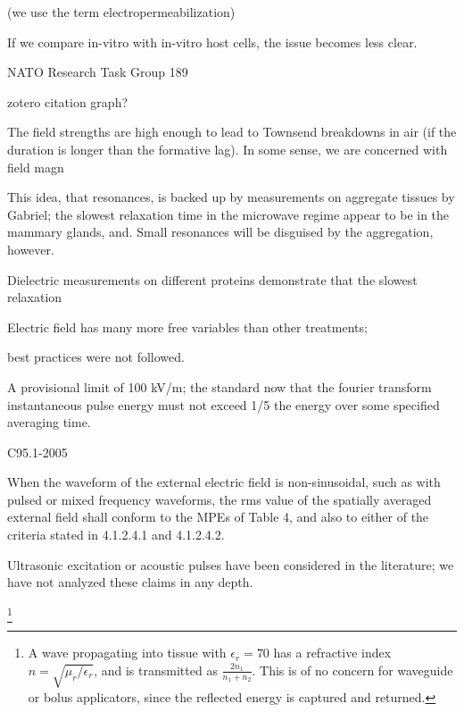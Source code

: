 \documentclass[paper.tex]{subfiles}
\begin{document}
\begin{multicols}{1}
(we use the term electropermeabilization)


If we compare in-vitro with in-vitro host cells, the issue becomes less clear.


NATO Research Task Group 189 \cite{treatyelectromagnetic}

zotero citation graph?


The field strengths are high enough to lead to Townsend breakdowns in air (if the duration is longer than the formative lag). In some sense, we are concerned with field magn

This idea, that resonances, is backed up by measurements on aggregate tissues by Gabriel; the slowest relaxation time in the microwave regime appear to be in the mammary glands, and. Small resonances will be disguised by the aggregation, however.


Dielectric measurements on different proteins demonstrate that the slowest relaxation 








Electric field has many more free variables than other treatments; 



best practices were not followed.





A provisional limit of 100 kV/m; the standard now that the fourier transform instantaneous pulse energy must not exceed 1/5 the energy over some specified averaging time.

C95.1-2005


When the waveform of the external electric field is non-sinusoidal, such as with pulsed or mixed frequency
waveforms, the rms value of the spatially averaged external field shall conform to the MPEs of Table 4, and
also to either of the criteria stated in 4.1.2.4.1 and 4.1.2.4.2.

 
Ultrasonic excitation or acoustic pulses have been considered in the literature; we have not analyzed these claims in any depth.







\footnote{A wave propagating into tissue with $\epsilon_r=70$ has a refractive index $n=\sqrt{\mu_r/\epsilon_r}$, and is transmitted as $\frac{2 n_1}{n_1 + n_2}$. This is of no concern for waveguide or bolus applicators, since the reflected energy is captured and returned.}







\end{multicols}
\end{document}
